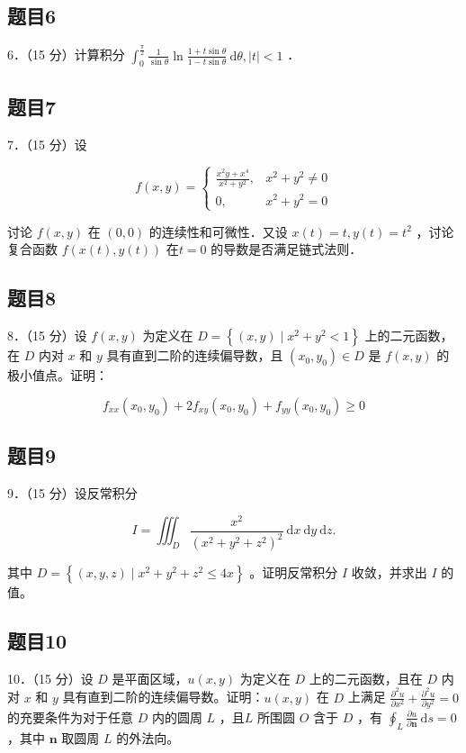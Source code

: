 \documentclass{article}
\begin{document}
\subsection{题目6}
6．（15 分）计算积分 \(\int_{0}^{\frac{\pi}{2}} \frac{1}{\sin \theta} \ln \frac{1+t \sin \theta}{1-t \sin \theta} \mathrm{~d} \theta,|t|<1\) ．

\subsection{题目7}
7．（15 分）设

\[
f(x, y)= \begin{cases}\frac{x^{2} y+x^{4}}{x^{2}+y^{2}}, & x^{2}+y^{2} \neq 0 \\ 0, & x^{2}+y^{2}=0\end{cases}
\]

讨论 \(f(x, y)\) 在 \((0,0)\) 的连续性和可微性．又设 \(x(t)=t, y(t)=t^{2}\) ，讨论复合函数 \(f(x(t), y(t))\) 在\(t=0\) 的导数是否满足链式法则．

\subsection{题目8}
8．（15 分）设 \(f(x, y)\) 为定义在 \(D=\left\{(x, y) \mid x^{2}+y^{2}<1\right\}\) 上的二元函数，在 \(D\) 内对 \(x\) 和 \(y\) 具有直到二阶的连续偏导数，且 \(\left(x_{0}, y_{0}\right) \in D\) 是 \(f(x, y)\) 的极小值点。证明：

\[
f_{x x}\left(x_{0}, y_{0}\right)+2 f_{x y}\left(x_{0}, y_{0}\right)+f_{y y}\left(x_{0}, y_{0}\right) \geq 0
\]

\subsection{题目9}
9．（15 分）设反常积分

\[
I=\iiint_{D} \frac{x^{2}}{\left(x^{2}+y^{2}+z^{2}\right)^{2}} \mathrm{~d} x \mathrm{~d} y \mathrm{~d} z .
\]

其中 \(D=\left\{(x, y, z) \mid x^{2}+y^{2}+z^{2} \leq 4 x\right\}\) 。证明反常积分 \(I\) 收敛，并求出 \(I\) 的值。

\subsection{题目10}
10．（15 分）设 \(D\) 是平面区域，\(u(x, y)\) 为定义在 \(D\) 上的二元函数，且在 \(D\) 内对 \(x\) 和 \(y\) 具有直到二阶的连续偏导数。证明：\(u(x, y)\) 在 \(D\) 上满足 \(\frac{\partial^{2} u}{\partial x^{2}}+\frac{\partial^{2} u}{\partial y^{2}}=0\) 的充要条件为对于任意 \(D\) 内的圆周 \(L\) ，且\(L\) 所围圆 \(O\) 含于 \(D\) ，有 \(\oint_{L} \frac{\partial u}{\partial \mathbf{n}} \mathrm{~d} s=0\) ，其中 \(\mathbf{n}\) 取圆周 \(L\) 的外法向。
\end{document}
